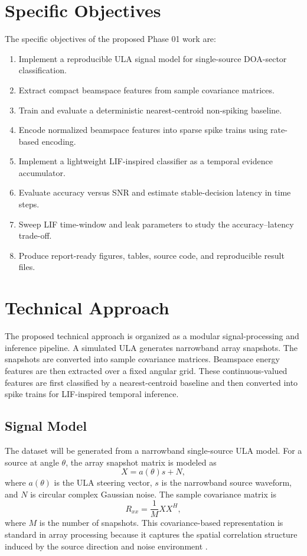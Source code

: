 \documentclass[11pt]{report}
\begin{document}
\section{Specific Objectives}

The specific objectives of the proposed Phase 01 work are:

\begin{enumerate}[label=\arabic*.]
    \item Implement a reproducible ULA signal model for single-source DOA-sector classification.
    \item Extract compact beamspace features from sample covariance matrices.
    \item Train and evaluate a deterministic nearest-centroid non-spiking baseline.
    \item Encode normalized beamspace features into sparse spike trains using rate-based encoding.
    \item Implement a lightweight LIF-inspired classifier as a temporal evidence accumulator.
    \item Evaluate accuracy versus SNR and estimate stable-decision latency in time steps.
    \item Sweep LIF time-window and leak parameters to study the accuracy--latency trade-off.
    \item Produce report-ready figures, tables, source code, and reproducible result files.
\end{enumerate}

\section{Technical Approach}

The proposed technical approach is organized as a modular signal-processing and inference pipeline. A simulated ULA generates narrowband array snapshots. The snapshots are converted into sample covariance matrices. Beamspace energy features are then extracted over a fixed angular grid. These continuous-valued features are first classified by a nearest-centroid baseline and then converted into spike trains for LIF-inspired temporal inference.

\subsection{Signal Model}

The dataset will be generated from a narrowband single-source ULA model. For a source at angle $\theta$, the array snapshot matrix is modeled as
\begin{equation}
    X = a(\theta)s + N,
\end{equation}
where $a(\theta)$ is the ULA steering vector, $s$ is the narrowband source waveform, and $N$ is circular complex Gaussian noise. The sample covariance matrix is
\begin{equation}
    R_{xx} = \frac{1}{M}XX^{H},
\end{equation}
where $M$ is the number of snapshots. This covariance-based representation is standard in array processing because it captures the spatial correlation structure induced by the source direction and noise environment \cite{vantrees2002optimum,haykin2014adaptive}.
\end{document}
